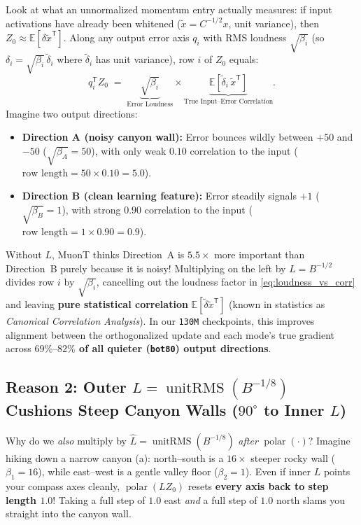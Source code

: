 \documentclass[11pt]{article}
\newcommand{\Tr}{{\mathsf{T}}}
\newcommand{\unitrms}{\operatorname{unitRMS}}
\newcommand{\polar}{\operatorname{polar}}
\newcommand{\E}{\mathbb{E}}
\newcommand{\mname}[1]{#1}
\begin{document}
Look at what an unnormalized momentum entry actually measures: if input activations have already been whitened ($\tilde{x} = C^{-1/2} x$, unit variance), then $Z_0 \approx \E[\delta \tilde{x}^{\Tr}]$.
Along any output error axis $q_i$ with RMS loudness $\sqrt{\beta_i}$ (so $\delta_i = \sqrt{\beta_i}\,\tilde{\delta}_i$ where $\tilde{\delta}_i$ has unit variance), row $i$ of $Z_0$ equals:
\begin{equation}
  q_i^{\Tr} Z_0 \;=\; \underbrace{\sqrt{\beta_i}}_{\text{Error Loudness}} \times \underbrace{\E\!\left[\tilde{\delta}_i\,\tilde{x}^{\Tr}\right]}_{\text{True Input--Error Correlation}}.
  \label{eq:loudness_vs_corr}
\end{equation}
Imagine two output directions:
\begin{itemize}[leftmargin=1.5em, itemsep=1.5pt, topsep=2pt]
  \item \textbf{Direction A (noisy canyon wall):} Error bounces wildly between $+50$ and $-50$ ($\sqrt{\beta_A} = 50$), with only weak $0.10$ correlation to the input ($\text{row length} = 50 \times 0.10 = \mathbf{5.0}$).
  \item \textbf{Direction B (clean learning feature):} Error steadily signals $+1$ ($\sqrt{\beta_B} = 1$), with strong $0.90$ correlation to the input ($\text{row length} = 1 \times 0.90 = \mathbf{0.9}$).
\end{itemize}
Without $L$, \mname{MuonT} thinks Direction~A is $5.5\times$ more important than Direction~B purely because it is noisy!
Multiplying on the left by $L = B^{-1/2}$ divides row $i$ by $\sqrt{\beta_i}$, cancelling out the loudness factor in \eqref{eq:loudness_vs_corr} and leaving \textbf{pure statistical correlation} $\E[\tilde{\delta}\tilde{x}^{\Tr}]$ (known in statistics as \emph{Canonical Correlation Analysis}).
In our \texttt{130M} checkpoints, this improves alignment between the orthogonalized update and each mode's true gradient across \textbf{$69\%\text{--}82\%$ of all quieter (\texttt{bot80}) output directions}.

\subsection{Reason 2: Outer \texorpdfstring{$\hat{L} = \unitrms(B^{-1/8})$}{L\_hat = unitRMS(B\^{}(-1/8))} Cushions Steep Canyon Walls (\texorpdfstring{$90^\circ$}{90 deg} to Inner \texorpdfstring{$L$}{L})}
\label{sec:reason_outer}

Why do we \emph{also} multiply by $\hat{L} = \unitrms(B^{-1/8})$ \emph{after} $\polar(\cdot)$?
Imagine hiking down a narrow canyon (a): north--south is a $16\times$ steeper rocky wall ($\beta_1 = 16$), while east--west is a gentle valley floor ($\beta_2 = 1$).
Even if inner $L$ points your compass axes cleanly, $\polar(L Z_0)$ resets \textbf{every axis back to step length $1.0$}! Taking a full step of $1.0$ east \emph{and} a full step of $1.0$ north slams you straight into the canyon wall.
\end{document}

